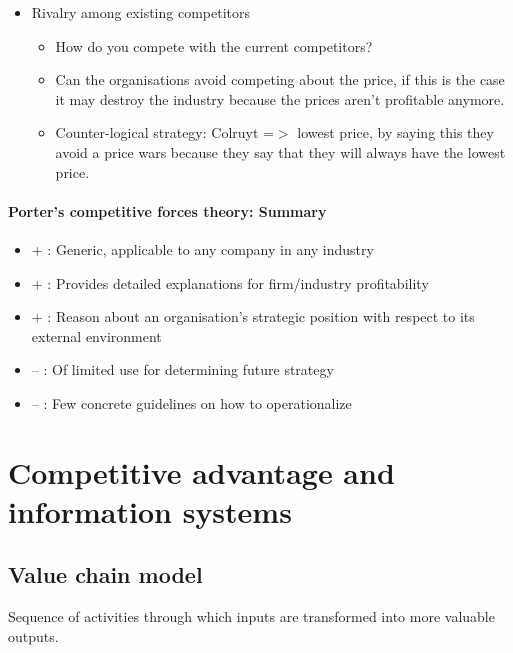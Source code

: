 \documentclass{article}
\begin{document}
\begin{itemize}
\item  Rivalry among existing competitors

\begin{itemize}
\item  How do you compete with the current competitors?

\item  Can the organisations avoid competing about the price, if this is the case it may destroy the industry because the prices aren't profitable anymore.

\item  Counter-logical strategy: Colruyt =$>$ lowest price, by saying this they avoid a price wars because they say that they will always have the lowest price.
\end{itemize}
\end{itemize}

\paragraph{Porter's competitive forces theory: Summary}

\begin{itemize}
\item   + : Generic, applicable to any company in any industry

\item   + : Provides detailed explanations for firm/industry profitability

\item   + : Reason about an organisation's strategic position with respect to its external environment

\item   -- : Of limited use for determining future strategy

\item   -- : Few concrete guidelines on how to operationalize
\end{itemize}

\section{Competitive advantage and information systems}

\subsection{Value chain model}

Sequence of activities through which inputs are transformed into more valuable outputs.
\end{document}
